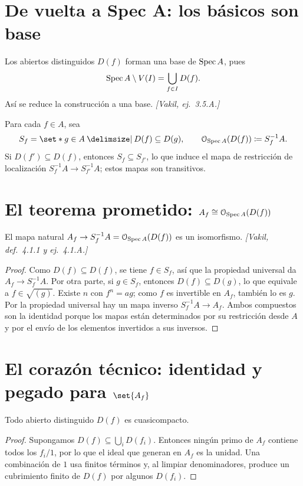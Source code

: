 \section{De vuelta a Spec A: los básicos son base}

Los abiertos distinguidos $D(f)$ forman una base de $\operatorname{Spec} A$, pues
\[
\operatorname{Spec} A\setminus V(I)=\bigcup_{f\in I}D(f).
\]
Así se reduce la construcción a una base. \emph{[Vakil, ej.~3.5.A.]}
\begin{defi}
\label{defi:s05-asignacion-candidata-basicos}
Para cada $f\in A$, sea
\[
S_f=\set*{g\in A \given D(f)\subseteq D(g)},\qquad
\mathcal O_{\Spec A}(D(f))\coloneqq S_f^{-1}A.
\]
Si $D(f')\subseteq D(f)$, entonces $S_f\subseteq S_{f'}$, lo que induce el mapa de restricción de localización $S_f^{-1}A\to S_{f'}^{-1}A$; estos mapas son transitivos.
\end{defi}

\section{\texorpdfstring{El teorema prometido: $A_f\cong\mathcal O_{\operatorname{Spec} A}(D(f))$}{El teorema prometido: Af es OSpec A(D(f))}}

\begin{teo}
\label{teo:s05-mapa-natural-f-s-f}
El mapa natural $A_f\to S_f^{-1}A=\mathcal O_{\operatorname{Spec} A}(D(f))$ es un isomorfismo. \emph{[Vakil, def.~4.1.1 y ej.~4.1.A.]}
\end{teo}
\begin{proof}
Como $D(f)\subseteq D(f)$, se tiene $f\in S_f$, así que la propiedad universal da $A_f\to S_f^{-1}A$. Por otra parte, si $g\in S_f$, entonces $D(f)\subseteq D(g)$, lo que equivale a $f\in\sqrt{(g)}$. Existe $n$ con $f^n=ag$; como $f$ es invertible en $A_f$, también lo es $g$. Por la propiedad universal hay un mapa inverso $S_f^{-1}A\to A_f$. Ambos compuestos son la identidad porque los mapas están determinados por su restricción desde $A$ y por el envío de los elementos invertidos a sus inversos.
\end{proof}

\section{\texorpdfstring{El corazón técnico: identidad y pegado para $\set{A_f}$}{El corazón técnico: identidad y pegado para Af}}

\begin{lema}
\label{lema:s05-cuasicompacidad-basicos}
Todo abierto distinguido $D(f)$ es cuasicompacto.
\end{lema}
\begin{proof}
Supongamos $D(f)\subseteq\bigcup_iD(f_i)$. Entonces ningún primo de $A_f$ contiene todos los $f_i/1$, por lo que el ideal que generan en $A_f$ es la unidad. Una combinación de $1$ usa finitos términos y, al limpiar denominadores, produce un cubrimiento finito de $D(f)$ por algunos $D(f_i)$.
\end{proof}

